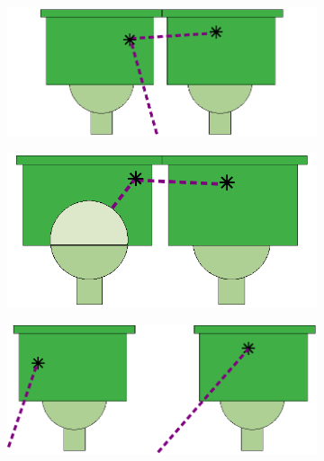 \begin{figure}[h]
  \centering
  \begin{subfigure}[t]{0.30\textwidth}
    \centering
    \includegraphics[height=0.50\textwidth]{commissioning/fig_commissioning/Co_bkg_1.pdf}
    \captionsetup{justification=justified}
    \caption{
      \label{subfig:Co_bkg_1}}
  \end{subfigure}
  \hfill
  \begin{subfigure}[t]{0.30\textwidth}
    \centering
    \includegraphics[height=0.50\textwidth]{commissioning/fig_commissioning/Co_bkg_2.pdf}
    \captionsetup{justification=justified}
    \caption{
      \label{subfig:Co_bkg_2}}
  \end{subfigure}
  \hfill
  \begin{subfigure}[t]{0.30\textwidth}
    \centering
    \includegraphics[height=0.50\textwidth]{commissioning/fig_commissioning/Co_bkg_3.pdf}

\end{subfigure}
\end{figure}
